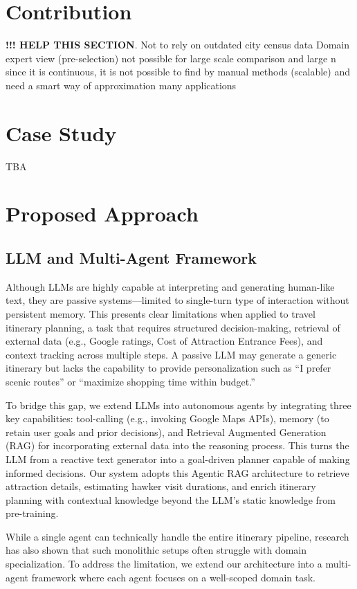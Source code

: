\documentclass{ecai}
\begin{document}
\section{Contribution}
\textbf{!!! HELP THIS SECTION}.  Not to rely on outdated city census data
Domain expert view (pre-selection) not possible for large scale comparison and large n
since it is continuous, it is not possible to find by manual methods (scalable) and need a smart way of approximation
many applications

\section{Case Study}
TBA

\section{Proposed Approach}
\subsection{LLM and Multi-Agent Framework}
Although LLMs are highly capable at interpreting and generating human-like text, they are passive systems—limited to single-turn type of interaction without persistent memory. This presents clear limitations when applied to travel itinerary planning, a task that requires structured decision-making, retrieval of external data (e.g., Google ratings, Cost of Attraction Entrance Fees), and context tracking across multiple steps. A passive LLM may generate a generic itinerary but lacks the capability to provide personalization such as “I prefer scenic routes” or “maximize shopping time within budget.”

To bridge this gap, we extend LLMs into autonomous agents by integrating three key capabilities: tool-calling (e.g., invoking Google Maps APIs), memory (to retain user goals and prior decisions), and Retrieval Augmented Generation (RAG) for incorporating external data into the reasoning process. This turns the LLM from a reactive text generator into a goal-driven planner capable of making informed decisions. Our system adopts this Agentic RAG architecture to retrieve attraction details, estimating hawker visit durations, and enrich itinerary planning with contextual knowledge beyond the LLM’s static knowledge from pre-training.

While a single agent can technically handle the entire itinerary pipeline, research has also shown that such monolithic setups often struggle with domain specialization. To address the limitation, we extend our architecture into a multi-agent framework where each agent focuses on a well-scoped domain task.
\end{document}
